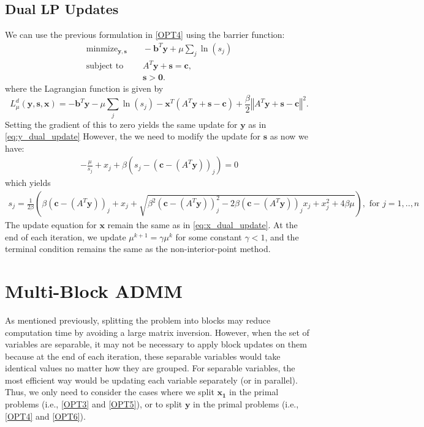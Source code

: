 \documentclass{article}
\begin{document}
\subsection*{Dual LP Updates}
We can use the previous formulation in \eqref{OPT4} using the barrier function:
\begin{align}
\text{minmize}_{\mathbf{y}, \mathbf{s}} &\quad -\mathbf{b}^T\mathbf{y} + \mu \sum_j \ln (s_j)  \tag{OPT6}\label{OPT6} \\
\text{subject to } &\quad  A^T \mathbf{y}  + \mathbf{s} = \mathbf{c},  \nonumber \\
&\quad \mathbf{s} > \mathbf{0} \nonumber.
\end{align}
where the Lagrangian function is given by
\[
L_{\mu}^{d}(\mathbf{y},\mathbf{s},\mathbf{x})=-\mathbf{b}^{T}\mathbf{y}-\mu\sum_{j}\ln\left(s_{j}\right)-\mathbf{x}^{T}\left(A^{T}\mathbf{y}+\mathbf{s}-\mathbf{c}\right)+\frac{\beta}{2}\left\Vert A^{T}\mathbf{y}+\mathbf{s}-\mathbf{c}\right\Vert ^{2}.
\]
Setting the gradient of this to zero yields the same update for $\mathbf{y}$ as in \eqref{eq:y_dual_update} 
However, the we need to modify the update for $\mathbf{s}$ as now we have:
\begin{align}
- \frac{\mu}{s_j} + x_j  + \beta \left(s_j - (\mathbf{c} - (A^T \mathbf{y}))_j\right)= 0
\end{align}
which yields 
\begin{align}
s_j = \frac{1}{2\beta}\left(\beta (\mathbf{c} - (A^T \mathbf{y}))_j + x_j  + \sqrt{\beta^2 (\mathbf{c} - (A^T \mathbf{y}))_j^2 - 2\beta (\mathbf{c} - (A^T \mathbf{y}))_j x_{j} + x_j^2 + 4\beta\mu } \right), \text{ for $j = 1,..,n$}
\end{align}
The update equation for $\mathbf{x}$ remain the same as in \eqref{eq:x_dual_update}. At the end of each iteration, we update $\mu^{k+1} = \gamma \mu^k$ for some constant $\gamma<1$, and the terminal condition remains the same as the non-interior-point method.



\vspace{0.5in}
\section{Multi-Block ADMM}

As mentioned previously, splitting the problem into blocks may reduce computation time by avoiding a large matrix inversion.
However, when the set of variables are separable, it may not be necessary to apply block updates on them because at the end of each iteration, these separable variables would take identical values no matter how they are grouped. For separable variables, the most efficient way would be updating each variable separately (or in parallel). Thus, we only need to consider the cases where we split $\mathbf{x_1}$ in the primal problems (i.e.,  \eqref{OPT3} and \eqref{OPT5}), or to split $\mathbf{y}$ in the primal problems (i.e.,  \eqref{OPT4} and \eqref{OPT6}).
\end{document}
